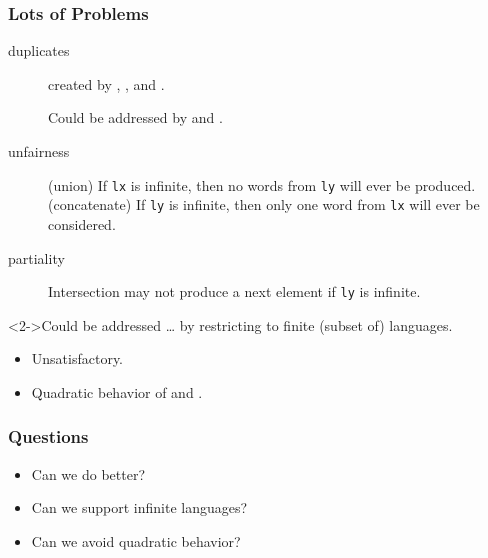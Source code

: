 \documentclass[pdftex]{beamer}
\begin{document}
\begin{frame}
  \frametitle{Lots of Problems}
  \begin{description}
  \item[duplicates] created by , , and .

    Could be addressed by  and .
  \item[unfairness] (union) If \texttt{lx} is infinite, then no words
    from \texttt{ly} will ever be produced.
    (concatenate) If \texttt{ly} is infinite, then only one word
    from \texttt{lx} will ever be considered.
  \item[partiality] Intersection may not produce a next element if \texttt{ly} is infinite.
  \end{description}
  \begin{block}<2->{Could be addressed \dots} by restricting to finite
    (subset of) languages.
    \begin{itemize}
    \item Unsatisfactory.
    \item 
      Quadratic behavior of  and .
  \end{itemize}
  \end{block}
\end{frame}

\begin{frame}
  \frametitle{Questions}
  \LARGE
  \begin{itemize}
  \item Can we do better?
  \item Can we support infinite languages?
  \item Can we avoid quadratic behavior?
  \end{itemize}
\end{frame}
\end{document}
